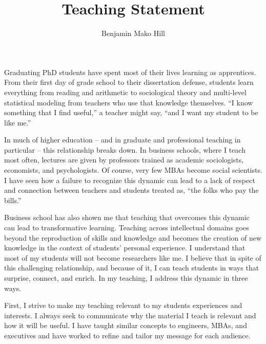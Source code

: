 \documentclass[10pt]{memoir}
\begin{document}
\setlength{\parskip}{4.5pt}

\baselineskip 14.5pt

\title{Teaching Statement}
\author{Benjamin Mako Hill}
\date{}


\maketitle

Graduating PhD students have spent most of their lives learning as
apprentices. From their first day of grade school to their
dissertation defense, students learn everything from reading and
arithmetic to sociological theory and multi-level statistical modeling
from teachers who use that knowledge themselves.  ``I know something
that I find useful,'' a teacher might say, ``and I want my student to
be like me.''

In much of higher education -- and in graduate and professional
teaching in particular -- this relationship breaks down. In business
schools, where I teach most often, lectures are given by professors
trained as academic sociologists, economists, and psychologists. Of
course, very few MBAs become social scientists. I have seen how a
failure to recognize this dynamic can lead to a lack of respect and
connection between teachers and students treated as, ``the folks who
pay the bills.''

Business school has also shown me that teaching that overcomes this
dynamic can lead to transformative learning. Teaching across
intellectual domains goes beyond the reproduction of skills and
knowledge and becomes the creation of new knowledge in the context of
students' personal experience. I understand that most of my students
will not become researchers like me. I believe that in spite of this
challenging relationship, and because of it, I can teach students in
ways that surprise, connect, and enrich. In my teaching, I address
this dynamic in three ways.

First, I strive to make my teaching relevant to my students
experiences and interests. I always seek to communicate why the
material I teach is relevant and how it will be useful. I have taught
similar concepts to engineers, MBAs, and executives and have worked
to refine and tailor my message for each audience.
\end{document}
